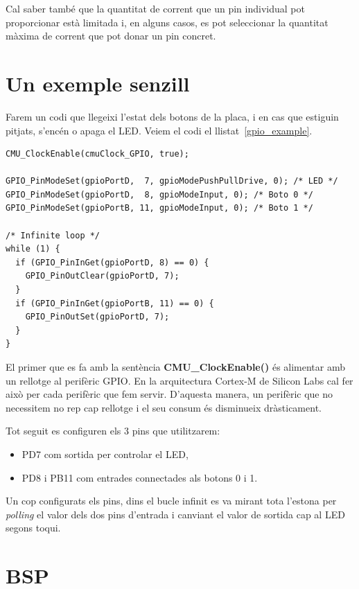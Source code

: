 Cal saber també que la quantitat de corrent que un pin individual pot proporcionar està limitada i, en alguns casos, es pot seleccionar la quantitat màxima de corrent que pot donar un pin concret.

\section{Un exemple senzill}
\label{sub:GPIO_2_example}
Farem un codi que llegeixi l'estat dels botons de la placa, i en cas que estiguin pitjats, s'encén o apaga el LED. Veiem el codi el llistat~\ref{gpio_example}.

\begin{lstlisting}[style=customc,caption={Codi d'exemple de GPIO},label=gpio_example]
CMU_ClockEnable(cmuClock_GPIO, true);

GPIO_PinModeSet(gpioPortD,  7, gpioModePushPullDrive, 0); /* LED */
GPIO_PinModeSet(gpioPortD,  8, gpioModeInput, 0); /* Boto 0 */
GPIO_PinModeSet(gpioPortB, 11, gpioModeInput, 0); /* Boto 1 */

/* Infinite loop */
while (1) {
  if (GPIO_PinInGet(gpioPortD, 8) == 0) {
    GPIO_PinOutClear(gpioPortD, 7);
  }
  if (GPIO_PinInGet(gpioPortB, 11) == 0) {
    GPIO_PinOutSet(gpioPortD, 7);
  }
}
\end{lstlisting}

El primer que es fa amb la sentència {\bf CMU\_ClockEnable()} és alimentar amb un rellotge al perifèric \gls{GPIO}. En la arquitectura Cortex-M de Silicon Labs cal fer això per cada perifèric que fem servir. D'aquesta manera, un perifèric que no necessitem no rep cap rellotge i el seu consum és disminueix dràsticament.

Tot seguit es configuren els 3 pins que utilitzarem:
\begin{itemize}
 \item PD7 com sortida per controlar el LED,
 \item PD8 i PB11 com entrades connectades als botons 0 i 1.
\end{itemize}

Un cop configurats els pins, dins el bucle infinit es va mirant tota l'estona per {\em polling} el valor dels dos pins d'entrada i canviant el valor de sortida cap al LED segons toqui.


\section{BSP}
\label{sec:BSP}

